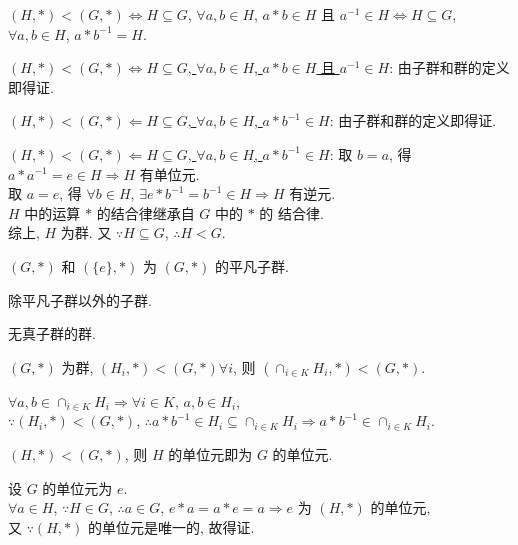 \documentclass{note}
\begin{document}
\begin{thm}
    $(H,*)<(G,*)\Longleftrightarrow H\subseteq G$, $\forall a,b\in H$, $a*b\in H$ 且 $a^{-1}\in H\Longleftrightarrow H\subseteq G$, $\forall a,b\in H$, $a*b^{-1}=H$.
\end{thm}
\begin{pf}
    \uline{$(H,*)<(G,*)\Longleftrightarrow H\subseteq G$, $\forall a,b\in H$, $a*b\in H$ 且 $a^{-1}\in H$}: 由子群和群的定义即得证.

    \uline{$(H,*)<(G,*)\Longleftarrow H\subseteq G$, $\forall a,b\in H$, $a*b^{-1}\in H$}: 由子群和群的定义即得证.

    \uline{$(H,*)<(G,*)\Longleftarrow H\subseteq G$, $\forall a,b\in H$, $a*b^{-1}\in H$}: 取 $b=a$, 得 $a*a^{-1}=e\in H\Longrightarrow H$ 有单位元.\\
    取 $a=e$, 得 $\forall b\in H$, $\exists e*b^{-1}=b^{-1}\in H\Longrightarrow H$ 有逆元.\\
    $H$ 中的运算 $*$ 的结合律继承自 $G$ 中的 $*$ 的 结合律.\\
    综上, $H$ 为群. 又 $\because H\subseteq G$, $\therefore H<G$.
\end{pf}

\begin{df}[平凡子群]
    $(G,*)$ 和 $(\{e\},*)$ 为 $(G,*)$ 的平凡子群.
\end{df}

\begin{df}
    除平凡子群以外的子群.
\end{df}

\begin{df}[单群]
    无真子群的群.
\end{df}

\begin{thm}[任意多个子群的交为子群]
    $(G,*)$ 为群, $(H_i,*)<(G,*)\forall i$, 则 $(\cap_{i\in K}H_i,*)<(G,*)$.
\end{thm}
\begin{pf}
    $\forall a,b\in\cap_{i\in K}H_i\Longrightarrow\forall i\in K$, $a,b\in H_i$,\\
    $\because(H_i,*)<(G,*)$, $\therefore a*b^{-1}\in H_i\subseteq\cap_{i\in K}H_i\Longrightarrow a*b^{-1}\in\cap_{i\in K}H_i$.
\end{pf}

\begin{thm}
    $(H,*)<(G,*)$, 则 $H$ 的单位元即为 $G$ 的单位元.
\end{thm}
\begin{pf}
    设 $G$ 的单位元为 $e$.\\
    $\forall a\in H$, $\because H\in G$, $\therefore a\in G$, $e*a=a*e=a\Longrightarrow e$ 为 $(H,*)$ 的单位元,\\
    又 $\because(H,*)$ 的单位元是唯一的, 故得证.
\end{pf}
\end{document}
